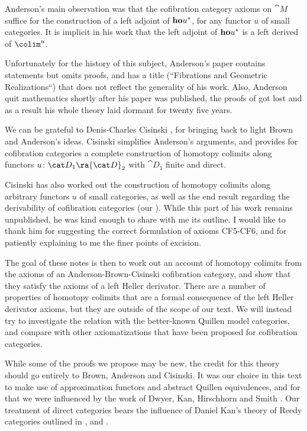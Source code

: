 Anderson's main observation was that the cofibration category axioms on ${\cat M}$ suffice for the construction of a left adjoint of ${\bf ho}u^*$, for any functor $u$ of small categories. It is implicit in his work that the left adjoint of ${\bf ho}u^*$ is a left derived of $\colim^u$.

Unfortunately for the history of this subject, Anderson's paper \cite{Anderson1} contains statements but omits proofs, and has a title (``Fibrations and Geometric Realizations``) that does not reflect the generality of his work. Also, Anderson quit mathematics shortly after his paper was published, the proofs of \cite{Anderson1} got lost and as a result his whole theory laid dormant for twenty five years.

\bigskip

We can be grateful to Denis-Charles Cisinski \cite{Cisinski2}, \cite{Cisinski4} for bringing back to light Brown and Anderson's ideas. Cisinski simplifies Anderson's arguments, and provides for cofibration categories a complete construction of homotopy colimits along functors $u \colon {\cat D}_1 \ra {\cat D}_2$ with ${\cat D}_1$ finite and direct. 

Cisinski has also worked out the construction of homotopy colimits along arbitrary functors $u$ of small categories, as well as the end result regarding the derivability of cofibration categories (our ). While this part of his work remains unpublished, he was kind enough to share with me its outline. I would like to thank him for suggesting the correct formulation of axioms CF5-CF6, and for patiently explaining to me the finer points of excision. 

\bigskip

The goal of these notes is then to work out an account of homotopy colimits from the axioms of an Anderson-Brown-Cisinski cofibration category, and show that they satisfy the axioms of a left Heller derivator. There are a number of properties of homotopy colimits that are a formal consequence of the left Heller derivator axioms, but they are outside of the scope of our text. We will instead try to investigate the relation with the better-known Quillen model categories, and compare with other axiomatizations that have been proposed for cofibration categories. 

While some of the proofs we propose may be new, the credit for this theory should go entirely to Brown, Anderson and Cisinski. It was our choice in this text to make use of approximation functors and abstract Quillen equivalences, and for that we were influenced by the work of Dwyer, Kan, Hirschhorn and Smith \cite{Dwyer-Kan-Hirschhorn-Smith}. Our treatment of direct categories bears the influence of Daniel Kan's theory of Reedy categories outlined in \cite{Dwyer-Kan-Hirschhorn}, \cite{Hovey} and \cite{Hirschhorn}.

